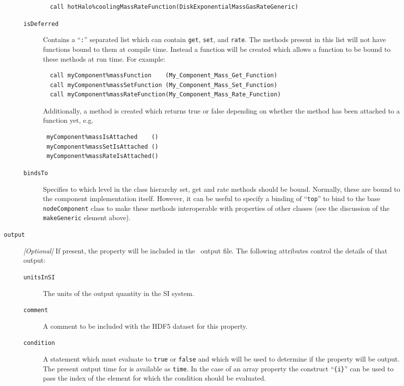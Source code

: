 \begin{description}
\begin{description}
\begin{description}
\begin{verbatim}
  call hotHalo%coolingMassRateFunction(DiskExponentialMassGasRateGeneric)
\end{verbatim}
\item [{\tt isDeferred}] Contains a ``{\tt :}'' separated list which can contain {\tt get}, {\tt set}, and {\tt rate}. The methods present in this list will not have functions bound to them at compile time. Instead a function will be created which allows a function to be bound to these methods at run time. For example:
\begin{verbatim}
  call myComponent%massFunction    (My_Component_Mass_Get_Function)
  call myComponent%massSetFunction (My_Component_Mass_Set_Function)
  call myComponent%massRateFunction(My_Component_Mass_Rate_Function)
\end{verbatim}
Additionally, a method is created which returns true or false depending on whether the method has been attached to a function yet, e.g.
\begin{verbatim}
 myComponent%massIsAttached    ()
 myComponent%massSetIsAttached ()
 myComponent%massRateIsAttached()
\end{verbatim}
\item [{\tt bindsTo}] Specifies to which level in the class hierarchy set, get and rate methods should be bound. Normally, these are bound to the component implementation itself. However, it can be useful to specify a binding of ``{\tt top}'' to bind to the base {\tt nodeComponent} class to make these methods interoperable with properties of other classes (see the discussion of the {\tt makeGeneric} element above).
\end{description}
\item [{\tt output}] \emph{[Optional]} If present, the property will be included in the \glc\ output file. The following attributes control the details of that output:
\begin{description}
\item [{\tt unitsInSI}] The units of the output quantity in the SI system.
\item [{\tt comment}] A comment to be included with the HDF5 dataset for this property.
\item [{\tt condition}] A statement which must evaluate to {\tt true} or {\tt false} and which will be used to determine if the property will be output. The present output time for is available as {\tt time}. In the case of an array property the construct ``{\tt \{i\}}'' can be used to pass the index of the element for which the condition should be evaluated.

\end{description}
\end{description}
\end{description}
